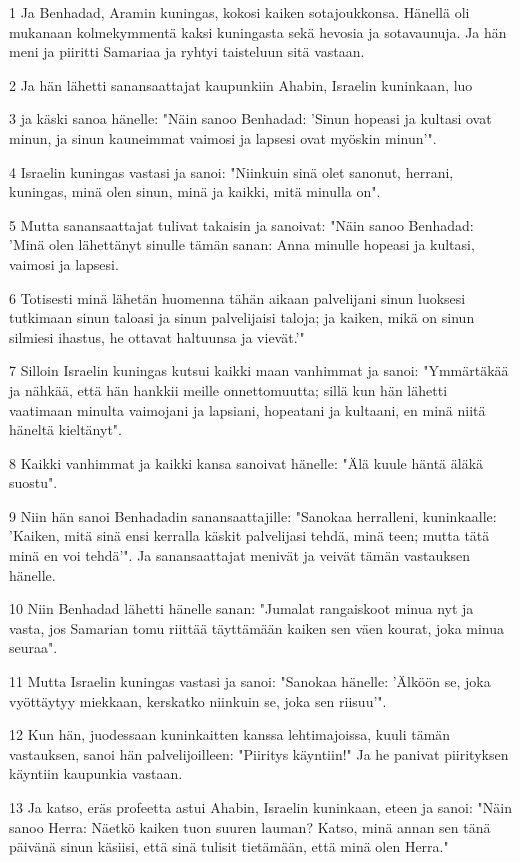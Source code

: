 \par 1 Ja Benhadad, Aramin kuningas, kokosi kaiken sotajoukkonsa. Hänellä oli mukanaan kolmekymmentä kaksi kuningasta sekä hevosia ja sotavaunuja. Ja hän meni ja piiritti Samariaa ja ryhtyi taisteluun sitä vastaan.
\par 2 Ja hän lähetti sanansaattajat kaupunkiin Ahabin, Israelin kuninkaan, luo
\par 3 ja käski sanoa hänelle: "Näin sanoo Benhadad: 'Sinun hopeasi ja kultasi ovat minun, ja sinun kauneimmat vaimosi ja lapsesi ovat myöskin minun'".
\par 4 Israelin kuningas vastasi ja sanoi: "Niinkuin sinä olet sanonut, herrani, kuningas, minä olen sinun, minä ja kaikki, mitä minulla on".
\par 5 Mutta sanansaattajat tulivat takaisin ja sanoivat: "Näin sanoo Benhadad: 'Minä olen lähettänyt sinulle tämän sanan: Anna minulle hopeasi ja kultasi, vaimosi ja lapsesi.
\par 6 Totisesti minä lähetän huomenna tähän aikaan palvelijani sinun luoksesi tutkimaan sinun taloasi ja sinun palvelijaisi taloja; ja kaiken, mikä on sinun silmiesi ihastus, he ottavat haltuunsa ja vievät.'"
\par 7 Silloin Israelin kuningas kutsui kaikki maan vanhimmat ja sanoi: "Ymmärtäkää ja nähkää, että hän hankkii meille onnettomuutta; sillä kun hän lähetti vaatimaan minulta vaimojani ja lapsiani, hopeatani ja kultaani, en minä niitä häneltä kieltänyt".
\par 8 Kaikki vanhimmat ja kaikki kansa sanoivat hänelle: "Älä kuule häntä äläkä suostu".
\par 9 Niin hän sanoi Benhadadin sanansaattajille: "Sanokaa herralleni, kuninkaalle: 'Kaiken, mitä sinä ensi kerralla käskit palvelijasi tehdä, minä teen; mutta tätä minä en voi tehdä'". Ja sanansaattajat menivät ja veivät tämän vastauksen hänelle.
\par 10 Niin Benhadad lähetti hänelle sanan: "Jumalat rangaiskoot minua nyt ja vasta, jos Samarian tomu riittää täyttämään kaiken sen väen kourat, joka minua seuraa".
\par 11 Mutta Israelin kuningas vastasi ja sanoi: "Sanokaa hänelle: 'Älköön se, joka vyöttäytyy miekkaan, kerskatko niinkuin se, joka sen riisuu'".
\par 12 Kun hän, juodessaan kuninkaitten kanssa lehtimajoissa, kuuli tämän vastauksen, sanoi hän palvelijoilleen: "Piiritys käyntiin!" Ja he panivat piirityksen käyntiin kaupunkia vastaan.
\par 13 Ja katso, eräs profeetta astui Ahabin, Israelin kuninkaan, eteen ja sanoi: "Näin sanoo Herra: Näetkö kaiken tuon suuren lauman? Katso, minä annan sen tänä päivänä sinun käsiisi, että sinä tulisit tietämään, että minä olen Herra."
